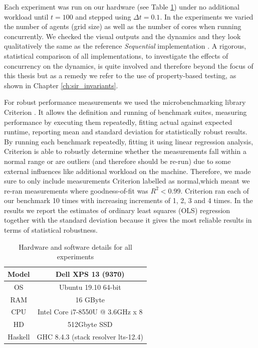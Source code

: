 Each experiment was run on our hardware (see Table \ref{tab:machine_specs}) under no additional workload until $t = 100$ and stepped using $\Delta t = 0.1$. In the experiments we varied the number of agents (grid size) as well as the number of cores when running concurrently. We checked the visual outputs and the dynamics and they look qualitatively the same as the reference \textit{Sequential} implementation \cite{thaler_pure_2018}. A rigorous, statistical comparison of all implementations, to investigate the effects of concurrency on the dynamics, is quite involved and therefore beyond the focus of this thesis but as a remedy we refer to the use of property-based testing, as shown in Chapter \ref{ch:sir_invariants}.

For robust performance measurements we used the microbenchmarking library Criterion \cite{criterion_serpentine, criterion_hackage}. It allows the definition and running of benchmark suites, measuring performance by executing them repeatedly, fitting actual against expected runtime, reporting mean and standard deviation for statistically robust results. By running each benchmark repeatedly, fitting it using linear regression analysis, Criterion is able to robustly determine whether the measurements fall within a normal range or are outliers (and therefore should be re-run) due to some external influences like additional workload on the machine. Therefore, we made sure to only include measurements Criterion labelled as normal,which meant we re-ran measurements where goodness-of-fit was $R^2 < 0.99$. Criterion ran each of our benchmark 10 times with increasing increments of 1, 2, 3 and 4 times. In the results we report the estimates of ordinary least squares (OLS) regression together with the standard deviation because it gives the most reliable results in terms of statistical robustness. 


\begin{table}
	\centering
	\begin{tabular}{ c || c }
		Model   & Dell XPS 13 (9370)				    \\ \hline
		OS      & Ubuntu 19.10 64-bit 				\\ \hline
		RAM     & 16 GByte 							\\ \hline
		CPU     & Intel Core i7-8550U @ 3.6GHz x 8 	\\ \hline
		HD      & 512Gbyte SSD 						\\ \hline
		Haskell & GHC 8.4.3 (stack resolver lts-12.4)
	\end{tabular}
	
	\caption{Hardware and software details for all experiments}
	\label{tab:machine_specs}
\end{table}

